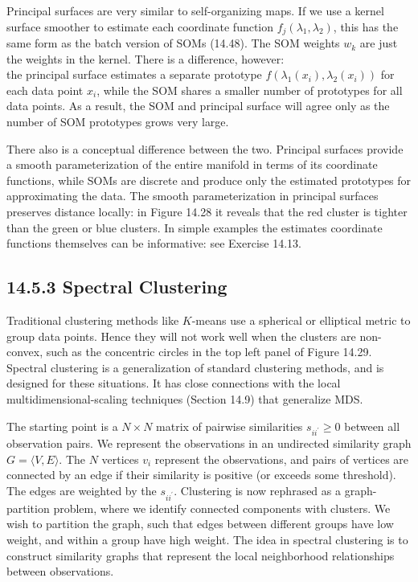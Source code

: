 \documentclass[10pt]{article}
\begin{document}
Principal surfaces are very similar to self-organizing maps. If we use a kernel surface smoother to estimate each coordinate function $f_{j}\left(\lambda_{1}, \lambda_{2}\right)$, this has the same form as the batch version of SOMs (14.48). The SOM weights $w_{k}$ are just the weights in the kernel. There is a difference, however:\\
the principal surface estimates a separate prototype $f\left(\lambda_{1}\left(x_{i}\right), \lambda_{2}\left(x_{i}\right)\right)$ for each data point $x_{i}$, while the SOM shares a smaller number of prototypes for all data points. As a result, the SOM and principal surface will agree only as the number of SOM prototypes grows very large.

There also is a conceptual difference between the two. Principal surfaces provide a smooth parameterization of the entire manifold in terms of its coordinate functions, while SOMs are discrete and produce only the estimated prototypes for approximating the data. The smooth parameterization in principal surfaces preserves distance locally: in Figure 14.28 it reveals that the red cluster is tighter than the green or blue clusters. In simple examples the estimates coordinate functions themselves can be informative: see Exercise 14.13.

\subsection*{14.5.3 Spectral Clustering}
Traditional clustering methods like $K$-means use a spherical or elliptical metric to group data points. Hence they will not work well when the clusters are non-convex, such as the concentric circles in the top left panel of Figure 14.29. Spectral clustering is a generalization of standard clustering methods, and is designed for these situations. It has close connections with the local multidimensional-scaling techniques (Section 14.9) that generalize MDS.

The starting point is a $N \times N$ matrix of pairwise similarities $s_{i i^{\prime}} \geq 0$ between all observation pairs. We represent the observations in an undirected similarity graph $G=\langle V, E\rangle$. The $N$ vertices $v_{i}$ represent the observations, and pairs of vertices are connected by an edge if their similarity is positive (or exceeds some threshold). The edges are weighted by the $s_{i i^{\prime}}$. Clustering is now rephrased as a graph-partition problem, where we identify connected components with clusters. We wish to partition the graph, such that edges between different groups have low weight, and within a group have high weight. The idea in spectral clustering is to construct similarity graphs that represent the local neighborhood relationships between observations.
\end{document}
